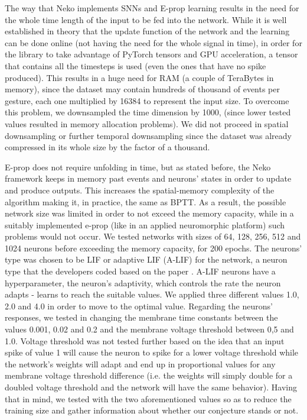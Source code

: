\documentclass[12pt]{report}
\begin{document}
The way that Neko implements SNNs and E-prop learning results in the need for the whole time length of the input to be fed into the network. While it is well established in theory that the update function of the network and the learning can be done online (not having the need for the whole signal in time), in order for the library to take advantage of PyTorch tensors and GPU acceleration, a tensor that contains all the timesteps is used (even the ones that have no spike produced). This results in a huge need for RAM (a couple of TeraBytes in memory), since the dataset may contain hundreds of thousand of events per gesture, each one multiplied by 16384 to represent the input size. To overcome this problem, we downsampled the time dimension by 1000, (since lower tested values resulted in memory allocation problems). We did not proceed in spatial downsampling or further temporal downsampling since the dataset was already compressed in its whole size by the factor of a thousand.

E-prop does not require unfolding in time, but as stated before, the Neko framework keeps in memory past events and neurons' states in order to update and produce outputs. This increases the spatial-memory complexity of the algorithm making it, in practice, the same as BPTT. As a result, the possible network size was limited in order to not exceed the memory capacity, while in a suitably implemented e-prop (like in an applied neuromorphic platform) such problems would not occur. We tested networks with sizes of 64, 128, 256, 512 and 1024 neurons before exceeding the memory capacity, for 200 epochs. The neurons' type was chosen to be LIF or adaptive LIF (A-LIF) for the network, a neuron type that the developers coded based on the paper \cite{Bellec2020}. A-LIF neurons have a hyperparameter, the neuron's adaptivity, which controls the rate the neuron adapts - learns to reach the suitable values. We applied three different values 1.0, 2.0 and 4.0 in order to move to the optimal value. Regarding the neurons' responses, we tested in changing the membrane time constants between the values 0.001, 0.02 and 0.2 and the membrane voltage threshold between 0,5 and 1.0. Voltage threshold was not tested further based on the idea that an input spike of value 1 will cause the neuron to spike for a lower voltage threshold while the network's weights will adapt and end up in proportional values for any membrane voltage threshold difference (i.e. the weights will simply double for a doubled voltage threshold and the network will have the same behavior). Having that in mind, we tested with the two aforementioned values so as to reduce the training size and gather information about whether our conjecture stands or not. 
\end{document}
